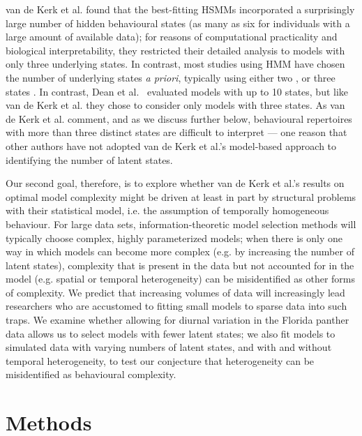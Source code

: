 \documentclass{bmcart}
\begin{document}
van de Kerk et al. \cite{kerk2015hidden} found that the best-fitting HSMMs
incorporated a surprisingly large number of hidden
behavioural states (as many as six for individuals with a large amount
of available data); for reasons of computational 
practicality and biological interpretability, they restricted their
detailed analysis to models with only three underlying states.  In
contrast, most studies using HMM have chosen the
number of underlying states \emph{a priori}, typically using either two
\cite{schliehe-diecks_application_2012,mckellar_using_2014,langrock_flexible_2012,fryxell_multiple_2008}, or three states
\cite{dean2012behavioural,morales_extracting_2004,franke_prediction_2006}. 
In contrast, Dean et al.~\cite{dean2012behavioural} evaluated models with up to 10
states, but like van de Kerk et al. they chose to consider only 
models with three states. 
As van de Kerk et al. \cite{kerk2015hidden} comment, and as
we discuss further below, behavioural
repertoires with more than three distinct states are difficult to
interpret --- one reason that other authors have not adopted
van de Kerk et al.'s model-based approach to
identifying the number of latent states.

Our second goal, therefore, is to explore whether
van de Kerk et al.'s results on optimal
model complexity might be driven at
least in part by structural problems with their statistical
model, i.e. the
assumption of temporally homogeneous behaviour.  For large data sets, 
information-theoretic model selection methods will
typically choose complex, highly parameterized models; when there is
only one way in which models can become more complex (e.g. by
increasing the number of latent states), complexity that is
present in the data but not accounted for in the model (e.g. spatial
or temporal heterogeneity) can be misidentified as other forms of
complexity.  We predict that increasing volumes of data will
increasingly lead researchers who are accustomed to fitting 
small models to sparse data into such traps.  We examine whether
allowing for diurnal variation in the Florida panther data allows us to
select models with fewer latent states; we also
fit models to simulated data with varying numbers of latent states,
and with and without temporal heterogeneity, to test our conjecture that
heterogeneity can be misidentified as behavioural complexity.

\section*{Methods}
\end{document}
